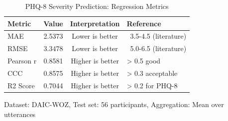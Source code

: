 \begin{table}[h]
\centering
\caption{PHQ-8 Severity Prediction: Regression Metrics}
\label{tab:regression_metrics}
\begin{tabular}{lccl}
\hline
\textbf{Metric} & \textbf{Value} & \textbf{Interpretation} & \textbf{Reference} \\
\hline
MAE & 2.5373 & Lower is better & ~3.5-4.5 (literature) \\
RMSE & 3.3478 & Lower is better & ~5.0-6.5 (literature) \\
Pearson r & 0.8581 & Higher is better & > 0.5 good \\
CCC & 0.8575 & Higher is better & > 0.3 acceptable \\
R2 Score & 0.7044 & Higher is better & > 0.2 for PHQ-8 \\
\hline
\end{tabular}
\begin{tablenotes}
\small
\item Dataset: DAIC-WOZ, Test set: 56 participants, Aggregation: Mean over utterances
\end{tablenotes}
\end{table}
